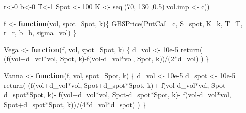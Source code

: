 \documentclass[
]{article}
\newenvironment{Shaded}{\begin{snugshade}}{\end{snugshade}}
\newcommand{\AttributeTok}[1]{\textcolor[rgb]{0.77,0.63,0.00}{#1}}
\newcommand{\ControlFlowTok}[1]{\textcolor[rgb]{0.13,0.29,0.53}{\textbf{#1}}}
\newcommand{\DecValTok}[1]{\textcolor[rgb]{0.00,0.00,0.81}{#1}}
\newcommand{\FloatTok}[1]{\textcolor[rgb]{0.00,0.00,0.81}{#1}}
\newcommand{\FunctionTok}[1]{\textcolor[rgb]{0.00,0.00,0.00}{#1}}
\newcommand{\NormalTok}[1]{#1}
\newcommand{\OtherTok}[1]{\textcolor[rgb]{0.56,0.35,0.01}{#1}}
\newcommand{\SpecialCharTok}[1]{\textcolor[rgb]{0.00,0.00,0.00}{#1}}
\newcommand{\StringTok}[1]{\textcolor[rgb]{0.31,0.60,0.02}{#1}}
\begin{document}
\begin{Shaded}
\begin{Highlighting}[]
\NormalTok{r}\OtherTok{\textless{}{-}}\DecValTok{0}
\NormalTok{b}\OtherTok{\textless{}{-}}\DecValTok{0}
\NormalTok{T}\OtherTok{\textless{}{-}}\DecValTok{1}
\NormalTok{Spot }\OtherTok{\textless{}{-}} \DecValTok{100}
\NormalTok{K }\OtherTok{\textless{}{-}} \FunctionTok{seq}\NormalTok{ (}\DecValTok{70}\NormalTok{, }\DecValTok{130}\NormalTok{ ,}\FloatTok{0.5}\NormalTok{)}
\NormalTok{vol.imp }\OtherTok{\textless{}{-}} \FunctionTok{c}\NormalTok{()}


\NormalTok{f }\OtherTok{\textless{}{-}} \ControlFlowTok{function}\NormalTok{(vol, }\AttributeTok{spot=}\NormalTok{Spot, k)\{}
  \FunctionTok{GBSPrice}\NormalTok{(}\AttributeTok{PutCall=}\StringTok{\textquotesingle{}c\textquotesingle{}}\NormalTok{, }\AttributeTok{S=}\NormalTok{spot, }\AttributeTok{K=}\NormalTok{k, }\AttributeTok{T=}\NormalTok{T, }\AttributeTok{r=}\NormalTok{r, }\AttributeTok{b=}\NormalTok{b, }\AttributeTok{sigma=}\NormalTok{vol)}
\NormalTok{\}}

\NormalTok{Vega }\OtherTok{\textless{}{-}} \ControlFlowTok{function}\NormalTok{(f, vol, }\AttributeTok{spot=}\NormalTok{Spot, k) \{}
\NormalTok{  d\_vol }\OtherTok{\textless{}{-}} \FloatTok{10e{-}5}
  \FunctionTok{return}\NormalTok{( (}\FunctionTok{f}\NormalTok{(vol}\SpecialCharTok{+}\NormalTok{d\_vol}\SpecialCharTok{*}\NormalTok{vol, Spot, k)}\SpecialCharTok{{-}}\FunctionTok{f}\NormalTok{(vol}\SpecialCharTok{{-}}\NormalTok{d\_vol}\SpecialCharTok{*}\NormalTok{vol, Spot, k))}\SpecialCharTok{/}\NormalTok{(}\DecValTok{2}\SpecialCharTok{*}\NormalTok{d\_vol) )}
\NormalTok{\}}

\NormalTok{Vanna }\OtherTok{\textless{}{-}} \ControlFlowTok{function}\NormalTok{(f, vol, }\AttributeTok{spot=}\NormalTok{Spot, k) \{}
\NormalTok{  d\_vol }\OtherTok{\textless{}{-}} \FloatTok{10e{-}5}
\NormalTok{  d\_spot }\OtherTok{\textless{}{-}} \FloatTok{10e{-}5}
  \FunctionTok{return}\NormalTok{( (}\FunctionTok{f}\NormalTok{(vol}\SpecialCharTok{+}\NormalTok{d\_vol}\SpecialCharTok{*}\NormalTok{vol, Spot}\SpecialCharTok{+}\NormalTok{d\_spot}\SpecialCharTok{*}\NormalTok{Spot, k)}\SpecialCharTok{+}
           \FunctionTok{f}\NormalTok{(vol}\SpecialCharTok{{-}}\NormalTok{d\_vol}\SpecialCharTok{*}\NormalTok{vol, Spot}\SpecialCharTok{{-}}\NormalTok{d\_spot}\SpecialCharTok{*}\NormalTok{Spot, k)}\SpecialCharTok{{-}}
           \FunctionTok{f}\NormalTok{(vol}\SpecialCharTok{+}\NormalTok{d\_vol}\SpecialCharTok{*}\NormalTok{vol, Spot}\SpecialCharTok{{-}}\NormalTok{d\_spot}\SpecialCharTok{*}\NormalTok{Spot, k)}\SpecialCharTok{{-}}
           \FunctionTok{f}\NormalTok{(vol}\SpecialCharTok{{-}}\NormalTok{d\_vol}\SpecialCharTok{*}\NormalTok{vol, Spot}\SpecialCharTok{+}\NormalTok{d\_spot}\SpecialCharTok{*}\NormalTok{Spot, k))}\SpecialCharTok{/}\NormalTok{(}\DecValTok{4}\SpecialCharTok{*}\NormalTok{d\_vol}\SpecialCharTok{*}\NormalTok{d\_spot) )}
\NormalTok{\}}
  

\end{Highlighting}
\end{Shaded}
\end{document}
